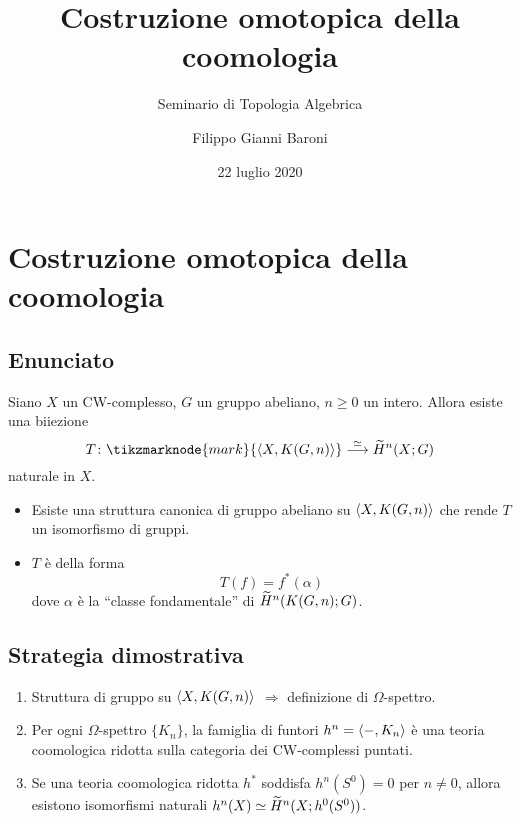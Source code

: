 \documentclass[9pt]{beamer}
\title{Costruzione omotopica della coomologia}
\subtitle{Seminario di Topologia Algebrica}
\author{Filippo Gianni Baroni}
\date{22 luglio 2020}
\begin{document}
\frame{\titlepage}

\newcommand*{\statemainresult}{%
\begin{theorem}
Siano $X$ un CW-complesso, $G$ un gruppo abeliano, $n\ge 0$ un intero. Allora esiste una biiezione
\[
\map[\iso]{T}{\tikzmarknode{mark}{\hmaps{X,K(G,n)}}}{\til{H}^n(X;G)}
\]
naturale in $X$.
\end{theorem}
}
\section*{Costruzione omotopica della coomologia}
\subsection*{Enunciato}
\begin{frame*}
\statemainresult%
\pause\pause
\begin{itemize}[<+->]
\item Esiste una struttura canonica di gruppo abeliano su $\langle X,K(G,n)\rangle$ che rende $T$ un isomorfismo di gruppi.
\item $T$ è della forma
\[
T(f)=f^*(\alpha)
\]
dove $\alpha$ è la ``classe fondamentale'' di $\widetilde{H}^n(K(G,n);G)$.
\end{itemize}
\end{frame*}

\subsection*{Strategia dimostrativa}
\begin{frame*}
\begin{enumerate}[<+->]
\addtolength\itemsep{1em}
\item Struttura di gruppo su $\langle X,K(G,n)\rangle$ $\Longrightarrow$ definizione di $\Omega$-spettro.
\item Per ogni $\Omega$-spettro $\{K_n\}$, la famiglia di funtori $h^n=\langle -,K_n\rangle$ è una teoria coomologica ridotta sulla categoria dei CW-complessi puntati.
\item Se una teoria coomologica ridotta $h^*$ soddisfa $h^n(S^0)=0$ per $n\neq 0$, allora esistono isomorfismi naturali $h^n(X)\simeq\widetilde{H}^n(X;h^0(S^0))$.
\end{enumerate}
\end{frame*}




\end{document}
